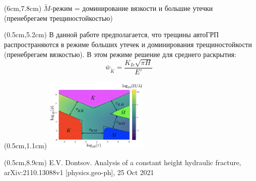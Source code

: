 \documentclass{beamer}
\begin{document}
\begin{frame}
\begin{textblock*}{6cm}(6cm,7.8cm)
\scriptsize
\textcolor{new_green}{
$\tilde{M}$-режим = доминирование вязкости и большие утечки (пренебрегаем трещиностойкостью)
}
\normalsize
\end{textblock*}

\begin{textblock*}{4.5cm}(0.5cm,5.2cm)
\scriptsize
\renewcommand{\baselinestretch}{0.7}
В данной работе предполагается, что трещины автоГРП распространяются в режиме больших утечек и доминирования трещиностойкости (пренебрегаем вязкостью).
В этом режиме решение для среднего раскрытия:
\vspace*{-3mm}
$$
\bar{w}_{\tilde{K}}=\frac{K_{Ic}\sqrt{\pi H}}{E'}
$$
\normalsize
\end{textblock*}



\begin{textblock*}{5cm}(0.5cm,1.1cm)
\includegraphics[width=5cm]{pkn_parametric_space.jpg}
\end{textblock*}

\begin{textblock*}{6cm}(0.5cm,8.9cm)
\tiny
\textcolor{lit_gray}{E.V. Dontsov. Analysis of a constant height hydraulic fracture, arXiv:2110.13088v1 [physics.geo-ph], 25 Oct 2021}
\end{textblock*}

\end{frame}
\end{document}
